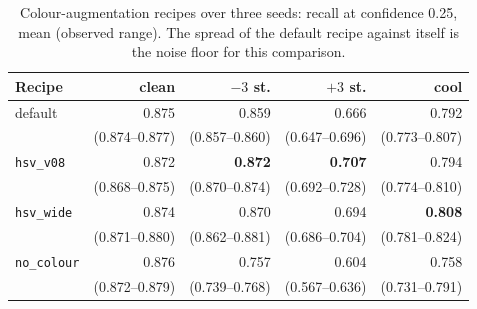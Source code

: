 \begin{table}[t]
\caption{Colour-augmentation recipes over three seeds: recall at confidence
0.25, mean (observed range). The spread of the default recipe against itself is
the noise floor for this comparison.}
\label{tab:seeds}
\centering
\begin{tabular}{lrrrr}
\toprule
Recipe & clean & $-3$ st. & $+3$ st. & cool \\
\midrule
default & 0.875 & 0.859 & 0.666 & 0.792 \\
 & \scriptsize(0.874--0.877) & \scriptsize(0.857--0.860) & \scriptsize(0.647--0.696) & \scriptsize(0.773--0.807) \\
\texttt{hsv\_v08} & 0.872 & \textbf{0.872} & \textbf{0.707} & 0.794 \\
 & \scriptsize(0.868--0.875) & \scriptsize(0.870--0.874) & \scriptsize(0.692--0.728) & \scriptsize(0.774--0.810) \\
\texttt{hsv\_wide} & 0.874 & 0.870 & 0.694 & \textbf{0.808} \\
 & \scriptsize(0.871--0.880) & \scriptsize(0.862--0.881) & \scriptsize(0.686--0.704) & \scriptsize(0.781--0.824) \\
\texttt{no\_colour} & 0.876 & 0.757 & 0.604 & 0.758 \\
 & \scriptsize(0.872--0.879) & \scriptsize(0.739--0.768) & \scriptsize(0.567--0.636) & \scriptsize(0.731--0.791) \\
\bottomrule
\end{tabular}
\end{table}

